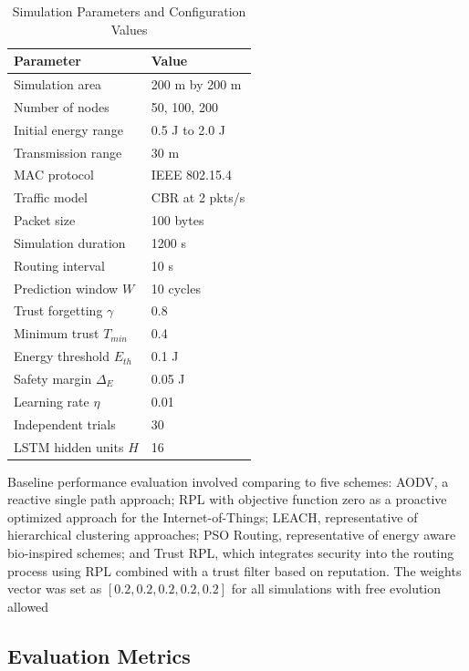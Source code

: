 \documentclass[a4paper,fleqn]{cas-dc}
\numberwithin{equation}{section}
\begin{document}
\begin{table}[htbp]
\centering
\caption{Simulation Parameters and Configuration Values}
\label{tab:sim_params}
\begin{tabular}{p{4.2cm} p{3.4cm}}
\toprule
\textbf{Parameter} & \textbf{Value} \\
\midrule
Simulation area             & 200 m by 200 m \\
Number of nodes             & 50, 100, 200 \\
Initial energy range        & 0.5 J to 2.0 J \\
Transmission range          & 30 m \\
MAC protocol                & IEEE 802.15.4 \\
Traffic model               & CBR at 2 pkts/s \\
Packet size                 & 100 bytes \\
Simulation duration         & 1200 s \\
Routing interval            & 10 s \\
Prediction window $W$       & 10 cycles \\
Trust forgetting $\gamma$   & 0.8 \\
Minimum trust $T_{min}$     & 0.4 \\
Energy threshold $E_{th}$   & 0.1 J \\
Safety margin $\Delta_E$    & 0.05 J \\
Learning rate $\eta$        & 0.01 \\
Independent trials          & 30 \\
LSTM hidden units $H$       & 16 \\
\bottomrule
\end{tabular}
\end{table}

Baseline performance evaluation involved comparing to five schemes: AODV,
a reactive single path approach; RPL with objective function zero
as a proactive optimized approach for the Internet-of-Things; LEACH,
representative of hierarchical clustering approaches; PSO Routing,
representative of energy aware bio-inspired schemes; and Trust
RPL, which integrates security into the routing process using RPL
combined with a trust filter based on reputation. \cite{R3_Narkedimilli2025AdaptiveCurriculumIoT, Harbi2023BlockchainIoDSecurity}
The weights vector was set as $[0.2, 0.2, 0.2, 0.2, 0.2]$
for all simulations with free evolution allowed

\subsection{Evaluation Metrics}
\label{subsec:evalmetrics}
\end{document}
